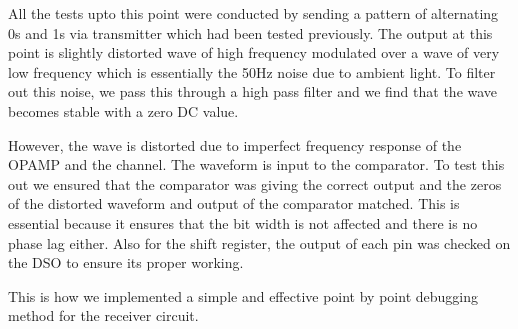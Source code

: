 \documentclass{article}
\begin{document}
All the tests upto this point were conducted by sending a pattern of alternating 0s and 1s via transmitter which had been tested previously. The output at this point is slightly distorted wave of high frequency modulated over a wave of very low frequency which is essentially the 50Hz noise due to ambient light. To filter out this noise, we pass this through a high pass filter and we find that the wave becomes stable with a zero DC value.

However, the wave is distorted due to imperfect frequency response of the OPAMP and the channel. The waveform is input to the comparator. To test this out we ensured that the comparator was giving the correct output and the zeros of the distorted waveform and output of the comparator matched. This is essential because it ensures that the bit width is not affected and there is no phase lag either. Also for the shift register, the output of each pin was checked on the DSO to ensure its proper working.

This is how we implemented a simple and effective point by point debugging method for the receiver circuit.
\end{document}
